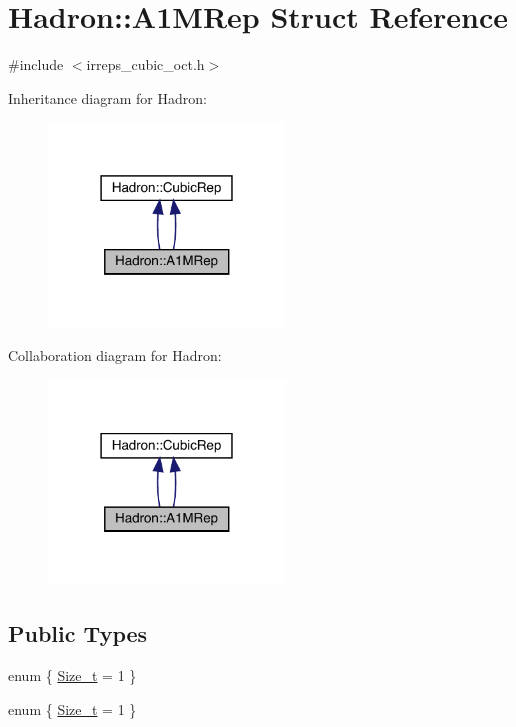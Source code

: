 \hypertarget{structHadron_1_1A1MRep}{}\section{Hadron\+:\+:A1\+M\+Rep Struct Reference}
\label{structHadron_1_1A1MRep}


{\ttfamily \#include $<$irreps\+\_\+cubic\+\_\+oct.\+h$>$}



Inheritance diagram for Hadron\+:\nopagebreak
\begin{figure}[H]
\begin{center}
\leavevmode
\includegraphics[width=178pt]{db/d3e/structHadron_1_1A1MRep__inherit__graph}
\end{center}
\end{figure}


Collaboration diagram for Hadron\+:\nopagebreak
\begin{figure}[H]
\begin{center}
\leavevmode
\includegraphics[width=178pt]{da/d56/structHadron_1_1A1MRep__coll__graph}
\end{center}
\end{figure}
\subsection*{Public Types}
\begin{DoxyCompactItemize}
\item 
enum \{ \mbox{\hyperlink{structHadron_1_1A1MRep_a36d7ad224fcdfef946b6a1a1e14e2ce4a8c0218fbd5c7fb561bbb665bfffbd142}{Size\+\_\+t}} = 1
 \}
\item 
enum \{ \mbox{\hyperlink{structHadron_1_1A1MRep_a36d7ad224fcdfef946b6a1a1e14e2ce4a8c0218fbd5c7fb561bbb665bfffbd142}{Size\+\_\+t}} = 1
 \}
\end{DoxyCompactItemize}
